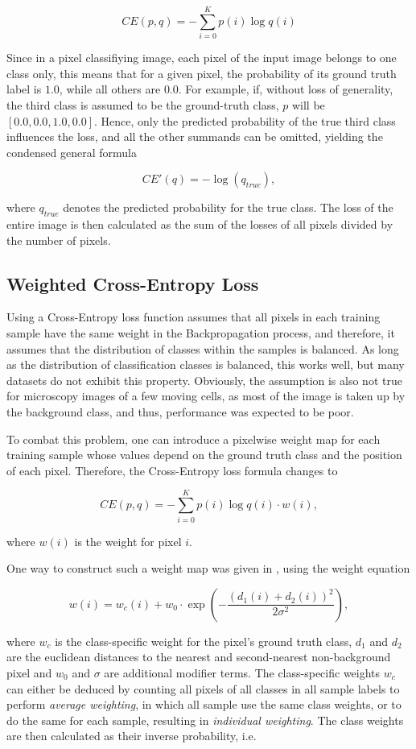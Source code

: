 \[CE(p, q) = -\sum \limits_{i = 0}^{K} p(i) \log q(i)\]

\noindent Since in a pixel classifiying image, each pixel of the input image belongs to one class only, this means that for a given pixel, the probability of its ground truth label is $1.0$, while all others are $0.0$. For example, if, without loss of generality, the third class is assumed to be the ground-truth class, $p$ will be $[0.0, 0.0, 1.0, 0.0]$.  Hence, only the predicted probability of the true third class influences the loss, and all the other summands can be omitted, yielding the condensed general formula

\[CE'(q) = - \log(q_{true}),\]

\noindent where $q_{true}$ denotes the predicted probability for the true class. The loss of the entire image is then calculated as the sum of the losses of all pixels divided by the number of pixels.


		\subsection{Weighted Cross-Entropy Loss}

Using a Cross-Entropy loss function assumes that all pixels in each training sample have the same weight in the Backpropagation process, and therefore, it assumes that the distribution of classes within the samples is balanced. As long as the distribution of classification classes is balanced, this works well, but many datasets do not exhibit this property. Obviously, the assumption is also not true for microscopy images of a few moving cells, as most of the image is taken up by the background class, and thus, performance was expected to be poor.

To combat this problem, one can introduce a pixelwise weight map for each training sample whose values depend on the ground truth class and the position of each pixel. Therefore, the Cross-Entropy loss formula changes to

\[CE(p, q) = -\sum \limits_{i = 0}^{K} p(i) \log q(i) \cdot w(i),\]

\noindent where $w(i)$ is the weight for pixel $i$.

One way to construct such a weight map was given in \cite{unet}, using the weight equation

\[ w(i) = w_c(i) + w_0 \cdot \exp \left (- \frac{(d_1(i) + d_2(i))^2}{2\sigma^2} \right ), \]

\noindent where $w_c$ is the class-specific weight for the pixel's ground truth class, $d_1$ and $d_2$ are the euclidean distances to the nearest and second-nearest non-background pixel and $w_0$ and $\sigma$ are additional modifier terms. The class-specific weights $w_c$ can either be deduced by counting all pixels of all classes in all sample labels to perform \textit{average weighting}, in which all sample use the same class weights, or to do the same for each sample, resulting in \textit{individual weighting}. The class weights are then calculated as their inverse probability, i.e.

